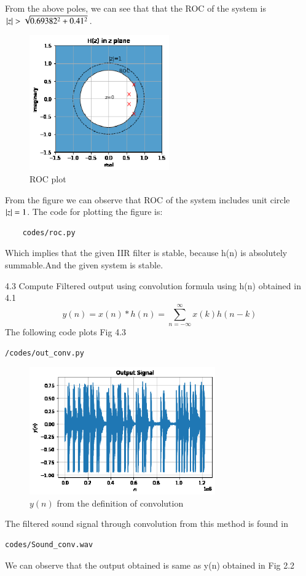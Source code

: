 \documentclass[journal,12pt,twocolumn]{IEEEtran}
\begin{document}
From the above poles, we can see that that the ROC of the system is $\left\vert z\right\vert>\sqrt{0.69382^{2}+0.41^{2}}$.
\begin{figure}[!ht]
\centering
\includegraphics[width=6cm]{./figs/roc.eps}
\caption{ROC plot}
\label{fig:xnhnfft}
\end{figure}
From the figure we can observe that ROC of the system includes unit circle $\left\vert z\right\vert=1$.
The code for plotting the figure is:
\begin{lstlisting}
    codes/roc.py
\end{lstlisting}
Which implies that the given IIR filter is stable, because h(n) is absolutely summable.And the given system is stable.

4.3 Compute Filtered output using convolution formula using h(n) obtained in 4.1
%
\begin{equation}
\label{eq:convolution}
y(n) = x(n)*h(n) = \sum_{n=-\infty}^{\infty}x(k)h(n-k)
\end{equation}
\solution The following code plots Fig 4.3
%
\begin{lstlisting}
/codes/out_conv.py
\end{lstlisting}
\begin{figure}[!ht]
\centering
\includegraphics[width=8cm]{./figs/digital_filter_output.eps}
\caption{$y(n)$ from the definition of convolution}
\label{fig:yn_conv}
\end{figure}
The filtered sound signal through convolution from this method is found in
\begin{lstlisting}
codes/Sound_conv.wav
\end{lstlisting}
We can observe that the output obtained is same as y(n) obtained in Fig 2.2
\end{document}
